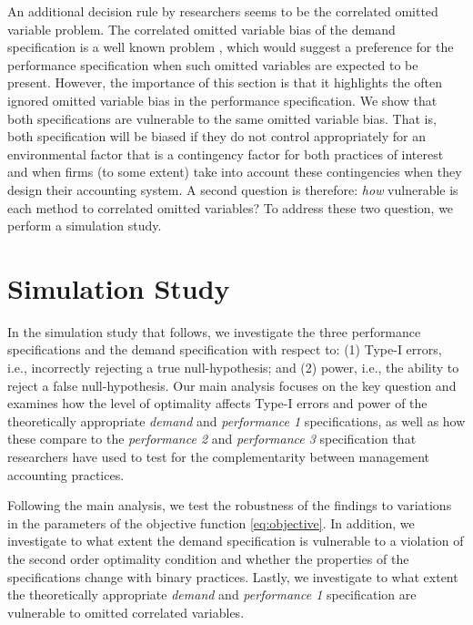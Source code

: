 \documentclass[12pt]{article}
\begin{document}
An additional decision rule by researchers seems to be the correlated omitted variable problem. The correlated omitted variable bias of the demand specification is a well known problem \citep{grabner_management_2013,arora_testing_1996,carree_note_2011}, which would suggest a preference for the performance specification when such omitted variables are expected to be present. However, the importance of this section is that it highlights the often ignored omitted variable bias in the performance specification. We show that both specifications are vulnerable to the same omitted variable bias. That is, both specification will be biased if they do not control appropriately for an environmental factor that is a contingency factor for both practices of interest and when firms (to some extent) take into account these contingencies when they design their accounting system. A second question is therefore: \emph{how} vulnerable is each method to correlated omitted variables? To address these two question, we perform a simulation study.

\section{Simulation Study}\label{simulation-study}

In the simulation study that follows, we investigate the three performance specifications and the demand specification with respect to: (1) Type-I errors, i.e., incorrectly rejecting a true null-hypothesis; and (2) power, i.e., the ability to reject a false null-hypothesis. Our main analysis focuses on the key question and examines how the level of optimality affects Type-I errors and power of the theoretically appropriate \emph{demand} and \emph{performance 1} specifications, as well as how these compare to the \emph{performance 2} and \emph{performance 3} specification that researchers have used to test for the complementarity between management accounting practices.  

Following the main analysis, we test the robustness of the findings to variations in the parameters of the objective function \ref{eq:objective}. In addition, we investigate to what extent the demand specification is vulnerable to a violation of the second order optimality condition and whether the properties of the specifications change with binary practices. Lastly, we investigate to what extent the theoretically appropriate \emph{demand} and \emph{performance 1} specification are vulnerable to omitted correlated variables. 
\end{document}
